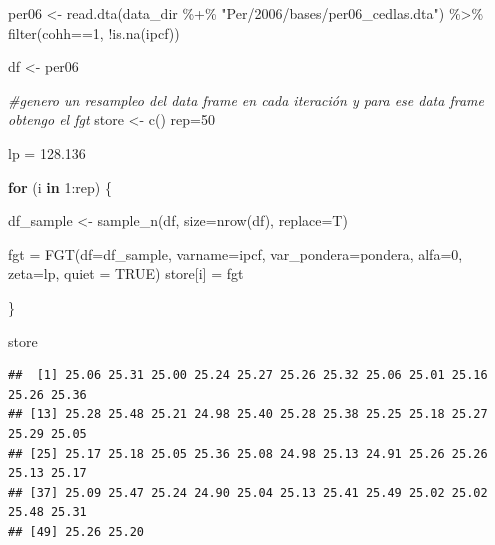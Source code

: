 \documentclass[
]{book}
\newenvironment{Shaded}{\begin{snugshade}}{\end{snugshade}}
\newcommand{\AttributeTok}[1]{\textcolor[rgb]{0.77,0.63,0.00}{#1}}
\newcommand{\CommentTok}[1]{\textcolor[rgb]{0.56,0.35,0.01}{\textit{#1}}}
\newcommand{\ConstantTok}[1]{\textcolor[rgb]{0.00,0.00,0.00}{#1}}
\newcommand{\ControlFlowTok}[1]{\textcolor[rgb]{0.13,0.29,0.53}{\textbf{#1}}}
\newcommand{\DecValTok}[1]{\textcolor[rgb]{0.00,0.00,0.81}{#1}}
\newcommand{\FloatTok}[1]{\textcolor[rgb]{0.00,0.00,0.81}{#1}}
\newcommand{\FunctionTok}[1]{\textcolor[rgb]{0.00,0.00,0.00}{#1}}
\newcommand{\NormalTok}[1]{#1}
\newcommand{\OtherTok}[1]{\textcolor[rgb]{0.56,0.35,0.01}{#1}}
\newcommand{\SpecialCharTok}[1]{\textcolor[rgb]{0.00,0.00,0.00}{#1}}
\newcommand{\StringTok}[1]{\textcolor[rgb]{0.31,0.60,0.02}{#1}}
\begin{document}
\begin{Shaded}
\begin{Highlighting}[]
\NormalTok{per06 }\OtherTok{\textless{}{-}} \FunctionTok{read.dta}\NormalTok{(data\_dir }\SpecialCharTok{\%+\%} \StringTok{"Per/2006/bases/per06\_cedlas.dta"}\NormalTok{) }\SpecialCharTok{\%\textgreater{}\%} 
        \FunctionTok{filter}\NormalTok{(cohh}\SpecialCharTok{==}\DecValTok{1}\NormalTok{, }\SpecialCharTok{!}\FunctionTok{is.na}\NormalTok{(ipcf))}

\NormalTok{df }\OtherTok{\textless{}{-}}\NormalTok{ per06}

\CommentTok{\#genero un resampleo del data frame en cada iteración y para ese data frame obtengo el fgt}
\NormalTok{store }\OtherTok{\textless{}{-}} \FunctionTok{c}\NormalTok{()}
\NormalTok{rep}\OtherTok{=}\DecValTok{50}

\NormalTok{lp }\OtherTok{=} \FloatTok{128.136}

\ControlFlowTok{for}\NormalTok{ (i }\ControlFlowTok{in} \DecValTok{1}\SpecialCharTok{:}\NormalTok{rep) \{}
  
\NormalTok{   df\_sample }\OtherTok{\textless{}{-}} \FunctionTok{sample\_n}\NormalTok{(df, }\AttributeTok{size=}\FunctionTok{nrow}\NormalTok{(df), }\AttributeTok{replace=}\NormalTok{T)}
   
\NormalTok{   fgt }\OtherTok{=} \FunctionTok{FGT}\NormalTok{(}\AttributeTok{df=}\NormalTok{df\_sample, }\AttributeTok{varname=}\NormalTok{ipcf, }\AttributeTok{var\_pondera=}\NormalTok{pondera, }\AttributeTok{alfa=}\DecValTok{0}\NormalTok{, }\AttributeTok{zeta=}\NormalTok{lp, }\AttributeTok{quiet =} \ConstantTok{TRUE}\NormalTok{)}
\NormalTok{   store[i] }\OtherTok{=}\NormalTok{ fgt}
   
\NormalTok{\}}
\end{Highlighting}
\end{Shaded}

\begin{Shaded}
\begin{Highlighting}[]
\NormalTok{store}
\end{Highlighting}
\end{Shaded}

\begin{verbatim}
##  [1] 25.06 25.31 25.00 25.24 25.27 25.26 25.32 25.06 25.01 25.16 25.26 25.36
## [13] 25.28 25.48 25.21 24.98 25.40 25.28 25.38 25.25 25.18 25.27 25.29 25.05
## [25] 25.17 25.18 25.05 25.36 25.08 24.98 25.13 24.91 25.26 25.26 25.13 25.17
## [37] 25.09 25.47 25.24 24.90 25.04 25.13 25.41 25.49 25.02 25.02 25.48 25.31
## [49] 25.26 25.20
\end{verbatim}
\end{document}
